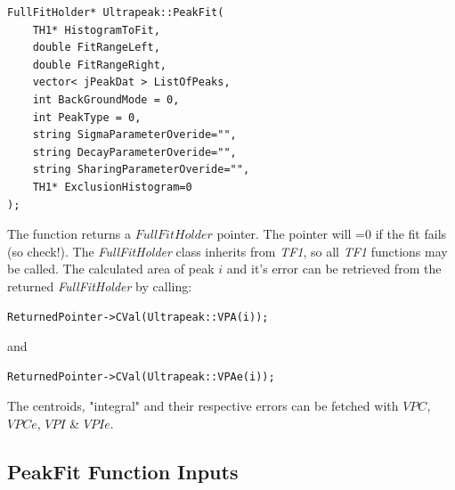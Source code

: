 \documentclass[a4paper,10pt]{article}
\begin{document}
\lstset{language=C++}
\begin{lstlisting}
FullFitHolder* Ultrapeak::PeakFit(
	TH1* HistogramToFit,
	double FitRangeLeft,
	double FitRangeRight,
	vector< jPeakDat > ListOfPeaks,
	int BackGroundMode = 0,
	int PeakType = 0,
	string SigmaParameterOveride="",
	string DecayParameterOveride="",
	string SharingParameterOveride="",
	TH1* ExclusionHistogram=0
);
\end{lstlisting}

The function returns a $FullFitHolder$ pointer. The pointer will =0 if the fit fails (so check!).
The \textit{FullFitHolder} class inherits from \textit{TF1}, so all \textit{TF1} functions may be called.
The calculated area of peak $i$ and it's error can be retrieved from the returned \textit{FullFitHolder} by calling:
\lstset{language=C++}
\begin{lstlisting}
ReturnedPointer->CVal(Ultrapeak::VPA(i));
\end{lstlisting}
and
\lstset{language=C++}
\begin{lstlisting}
ReturnedPointer->CVal(Ultrapeak::VPAe(i));
\end{lstlisting}
The centroids, "integral" and their respective errors can be fetched with $VPC$, $VPCe$, $VPI$ \& $VPIe$.


\subsection{PeakFit Function Inputs}
\end{document}
